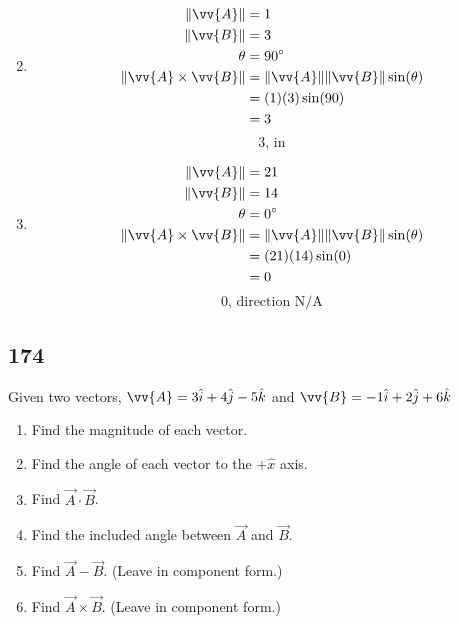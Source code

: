 \documentclass{article}
\begin{document}
\begin{enumerate}[label=\arabic*)]
\begin{equation*}
        \end{equation*}
    \item
        \begin{align*}
            \|\vv{A}\| & = 1 \\
            \|\vv{B}\| & = 3 \\
            \theta & = 90\degree \\
            \|\vv{A} \times \vv{B}\| & = \|\vv{A}\|\|\vv{B}\|\sin(\theta) \\
                                     & = (1)(3)\sin(90) \\
                                     & = 3
        \end{align*}
        \begin{equation*}
            \boxed{3 \text{, in}}
        \end{equation*}
    \item
        \begin{align*}
            \|\vv{A}\| & = 21 \\
            \|\vv{B}\| & = 14 \\
            \theta & = 0\degree \\
            \|\vv{A} \times \vv{B}\| & = \|\vv{A}\|\|\vv{B}\|\sin(\theta) \\
                                     & = (21)(14)\sin(0) \\
                                     & = 0
        \end{align*}
        \begin{equation*}
            \boxed{0 \text{, direction N/A}}
        \end{equation*}
\end{enumerate}

\subsection{174}

Given two vectors, $ \vv{A} = 3\hat{i} + 4\hat{j} - 5\hat{k} $ and $ \vv{B} = -1\hat{i} + 2\hat{j} + 6\hat{k} $
\begin{enumerate}[label=\alph*)]
    \item Find the magnitude of each vector.
    \item Find the angle of each vector to the $ +\hat{x} $ axis.
    \item Find $ \vec{A} \cdot \vec{B} $.
    \item Find the included angle between $ \vec{A} $ and $ \vec{B} $.
    \item Find $ \vec{A} - \vec{B} $. (Leave in component form.)
    \item Find $ \vec{A} \times \vec{B} $. (Leave in component form.)
\end{enumerate}
\end{document}
